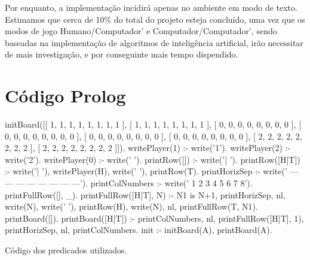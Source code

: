 \documentclass[15pt,a4paper]{article}
\begin{document}
 Por enquanto, a implementação incidirá apenas no ambiente em modo de texto.
Estimamos que cerca de 10\% do total do projeto esteja concluído, uma vez que os modos de jogo Humano/Computador' e Computador/Computador', sendo baseadas na implementação de algoritmos de inteligência artificial, irão necessitar de mais investigação, e por conseguinte mais tempo dispendido.




\clearpage

\renewcommand\refname{Bibliografia}



\nocite{tut1}
\nocite{tut2}


\newpage

\appendix
\section{Código Prolog}

\begin{code}[H]
	\begin{verbatimtab} %
initBoard([[ 1, 1, 1, 1, 1, 1, 1, 1 ],
	   [ 1, 1, 1, 1, 1, 1, 1, 1 ],
	   [ 0, 0, 0, 0, 0, 0, 0, 0 ],
	   [ 0, 0, 0, 0, 0, 0, 0, 0 ],
	   [ 0, 0, 0, 0, 0, 0, 0, 0 ],
	   [ 0, 0, 0, 0, 0, 0, 0, 0 ],
	   [ 2, 2, 2, 2, 2, 2, 2, 2 ],
	   [ 2, 2, 2, 2, 2, 2, 2, 2 ]]).
writePlayer(1) :-
	write('1').
writePlayer(2) :-
	write('2').
writePlayer(0) :-
	write(' ').
printRow([])    :- 
	write('| ').
printRow([H|T]) :-
	write('| '),
	writePlayer(H),
	write(' '),
	printRow(T).
printHorizSep   :-
	write('   --- --- --- --- --- --- --- ---').
printColNumbers :-
	write('    1   2   3   4   5   6   7   8').
printFullRow([], _).
printFullRow([H|T], N) :-
	N1 is N+1,
	printHorizSep,
	nl,
	write(N),
	write(' '),
	printRow(H),
	write(N),
	nl,
	printFullRow(T, N1).
printBoard([]).
printBoard([H|T]) :-
	printColNumbers,
	nl,
	printFullRow([H|T], 1),
	printHorizSep,
	nl,
	printColNumbers.
init :-
	initBoard(A),
	printBoard(A).
\end{verbatimtab}
\caption{Código dos predicados utilizados.}
\end{code}
\end{document}
